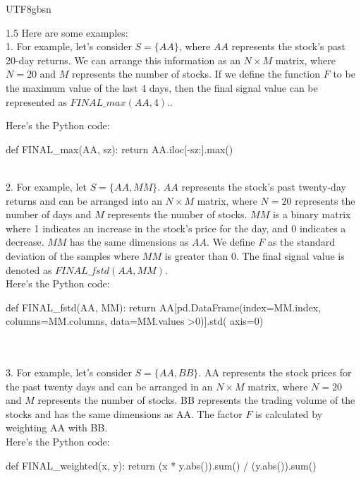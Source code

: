 \documentclass{article}
\begin{document}
\begin{CJK}{UTF8}{gbsn}
\begin{spacing}{1.5}
Here are some examples:  \\

  1. For example, let's consider $S = \{AA\}$, where $AA$ represents the stock's past 20-day returns. We can arrange this information as an $N \times M$ matrix, where $N = 20$ and $M$ represents the number of stocks.
  If we define the function $F$ to be the maximum value of the last 4 days, then the final signal value can be represented as $FINAL\_max(AA,4).$.

  Here's the Python code:\\
  \centerline{def FINAL\_max(AA, sz): return AA.iloc[-sz:].max()}
  \\



  2. For example, let $S = \{AA, MM\}$. $AA$ represents the stock's past twenty-day returns and can be arranged into an $N \times M$ matrix, where $N=20$ represents the number of days and $M$ represents the number of stocks. $MM$ is a binary matrix where 1 indicates an increase in the stock's price for the day, and 0 indicates a decrease. $MM$ has the same dimensions as $AA$. We define $F$ as the standard deviation of the samples where $MM$ is greater than 0. The final signal value is denoted as $FINAL\_fstd(AA,MM)$.\\
  Here's the Python code:\\
  \small \centerline {def FINAL\_fstd(AA, MM): return AA[pd.DataFrame(index=MM.index, columns=MM.columns, data=MM.values \textgreater 0)].std( axis=0) }
  \normalsize
  \\
  \\
  3. For example, let's consider $S = \{AA, BB\}$. AA represents the stock prices for the past twenty days and can be arranged in an $N \times M$ matrix, where $N=20$ and $M$ represents the number of stocks. BB represents the trading volume of the stocks and has the same dimensions as AA. The factor $F$ is calculated by weighting AA with BB.\\
  Here's the Python code:\\
  \centerline{ def FINAL\_weighted(x, y): return (x * y.abs()).sum() / (y.abs()).sum() }
  \\


\end{spacing}
\end{CJK}
\end{document}

